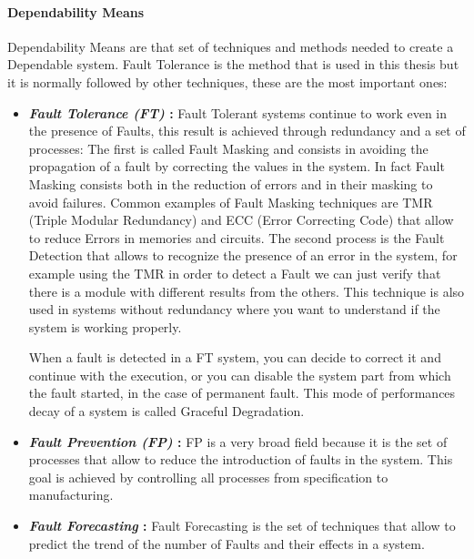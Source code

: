 {{{			\paragraph*{Dependability Means}{
				Dependability Means are that set of techniques and methods needed to create a Dependable system. Fault Tolerance is the method that is used in this thesis but it is normally followed by other techniques, these are the most important ones:
				\begin{itemize}
					\item \textbf{\textit{Fault Tolerance (FT)} : } Fault Tolerant systems continue to work even in the presence of Faults, this result is achieved through redundancy and a set of processes: The first is called Fault Masking and consists in avoiding the propagation of a fault by correcting the values in the system. In fact Fault Masking consists both in the reduction of errors and in their masking to avoid failures. Common examples of Fault Masking techniques are TMR (Triple Modular Redundancy) and ECC (Error Correcting Code) that allow to reduce Errors in memories and circuits. The second process is the Fault Detection that allows to recognize the presence of an error in the system, for example using the TMR in order to detect a Fault we can just verify that there is a module with different results from the others. This technique is also used in systems without redundancy where you want to understand if the system is working properly.
					
					When a fault is detected in a FT system, you can decide to correct it and continue with the execution, or you can disable the system part from which the fault started, in the case of permanent fault. This mode of performances decay of a system is called Graceful Degradation. 
					
					\item \textbf{\textit{Fault Prevention (FP)} : } FP is a very broad field because it is the set of processes that allow to reduce the introduction of faults in the system. This goal is achieved by controlling all processes from specification to manufacturing.
					
					\item \textbf{\textit{Fault Forecasting} : } Fault Forecasting is the set of techniques that allow to predict the trend of the number of Faults and their effects in a system.
					

\end{itemize}}}}}
